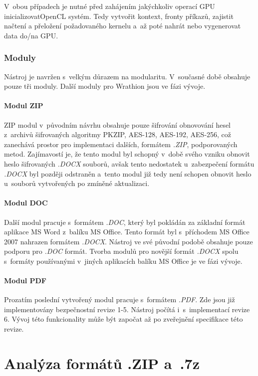  V~obou případech je nutné před zahájením jakýchkoliv operací GPU
 inicializovat\linebreak OpenCL systém. Tedy vytvořit kontext, fronty příkazů, zajistit načtení a
 přeložení požadovaného kernelu a~až poté nahrát nebo vygenerovat data do/na GPU.

\subsection{Moduly}
Nástroj je navržen s~velkým důrazem na modularitu. V~současné době obsahuje pouze tři moduly.
Další moduly pro Wrathion jsou ve fázi vývoje.

\subsubsection{Modul ZIP}
ZIP modul v~původním návrhu obsahuje pouze šifrování obnovování hesel z~archivů šifrovaných
algoritmy PKZIP, AES-128, AES-192, AES-256, což zanechává prostor pro implementaci dalších, formátem
{\it .ZIP}, podporovaných metod. Zajímavostí je, že tento modul byl schopný v~době svého vzniku
obnovit heslo šifrovaných {\it .DOCX} souborů, avšak tento nedostatek u~zabezpečení formátu {\it
.DOCX} byl později odstraněn a~tento modul již tedy není schopen obnovit heslo u~souborů vytvořených
po zmíněné aktualizaci.

\subsubsection{Modul DOC}
Další modul pracuje s~formátem {\it .DOC}, který byl pokládán za základní formát aplikace MS Word
z~balíku MS Office. Tento formát byl s~příchodem MS Office 2007 nahrazen formátem {\it .DOCX}.
Nástroj ve své původní podobě obsahuje pouze podporu pro {\it .DOC} formát. Tvorba modulů pro
novější formát {\it .DOCX} spolu s~formáty používanými v~jiných aplikacích balíku MS Office je ve
fázi vývoje.

\subsubsection{Modul PDF}
Prozatím poslední vytvořený modul pracuje s~formátem {\it .PDF}. Zde jsou již implementovány
bezpečnostní revize 1-5. Nástroj počítá i~s~implementací revize 6. Vývoj této funkcionality může
být započat až po zveřejnění specifikace této revize.


\chapter{Analýza formátů .ZIP a~.7z}
\label{ch:formaty}

